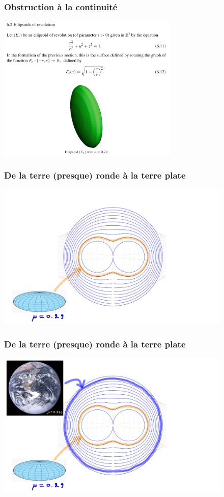 \documentclass[9pt]{beamer}
\begin{document}
\begin{frame}
\frametitle{\bf Obstruction \`a la continuit\'e}
 
\centering \includegraphics[height=7.0cm]{figal2}

\end{frame}

\begin{frame}
\frametitle{\bf De la terre (presque) ronde \`a la terre plate}
 
\centering \includegraphics[height=7.0cm]{oblat1}

\end{frame}

\begin{frame}
\frametitle{\bf De la terre (presque) ronde \`a la terre plate}
 
\centering \includegraphics[height=7.0cm]{oblat2}

\end{frame}
\end{document}
